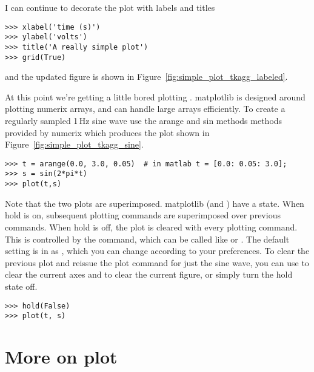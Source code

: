 \documentclass[]{book}
\begin{document}
I can continue to decorate the plot with labels and titles

\begin{lstlisting}
>>> xlabel('time (s)')
>>> ylabel('volts')
>>> title('A really simple plot')
>>> grid(True)
\end{lstlisting}

\noindent and the updated figure is shown in Figure~\ref{fig:simple_plot_tkagg_labeled}.


At this point we're getting a little bored plotting \code{[1,2,3]}.
matplotlib is designed around plotting numerix arrays, and can handle
large arrays efficiently.  To create a regularly sampled 1\,Hz sine
wave use the arange and sin methods methods provided by numerix which
produces the plot shown in Figure~\ref{fig:simple_plot_tkagg_sine}.

\begin{lstlisting}
>>> t = arange(0.0, 3.0, 0.05)  # in matlab t = [0.0: 0.05: 3.0];
>>> s = sin(2*pi*t)
>>> plot(t,s)
\end{lstlisting}


\noindent Note that the two plots are superimposed.  matplotlib (and
\matlab) have a  state.  When hold is on, subsequent
plotting commands are superimposed over previous commands.  When hold
is off, the plot is cleared with every plotting command.  This is
controlled by the  command, which can be called like
 or .  The default setting is in
 as , which you can change
according to your preferences.  To clear the previous plot and reissue
the plot command for just the sine wave, you can use  to
clear the current axes and  to clear the current figure, or
simply turn the hold state off.

\begin{lstlisting}
>>> hold(False)
>>> plot(t, s)
\end{lstlisting}

\section{More on plot}
\label{sec:plot}
\end{document}
